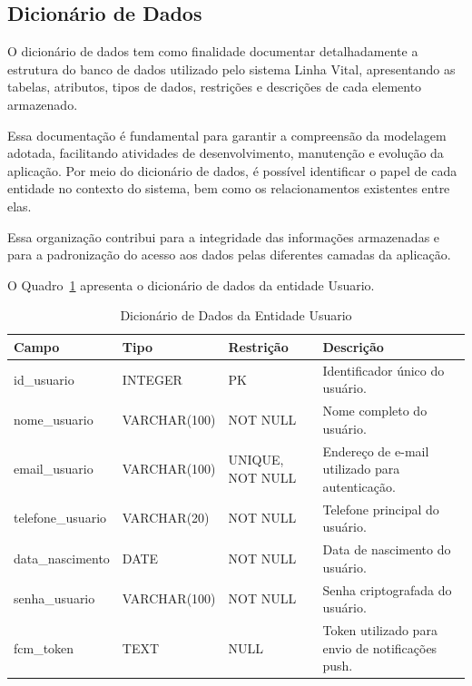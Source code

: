 \subsection{Dicionário de Dados}

O dicionário de dados tem como finalidade documentar detalhadamente a estrutura do banco de dados utilizado pelo sistema Linha Vital, apresentando as tabelas, atributos, tipos de dados, restrições e descrições de cada elemento armazenado.

Essa documentação é fundamental para garantir a compreensão da modelagem adotada, facilitando atividades de desenvolvimento, manutenção e evolução da aplicação. Por meio do dicionário de dados, é possível identificar o papel de cada entidade no contexto do sistema, bem como os relacionamentos existentes entre elas.

Essa organização contribui para a integridade das informações armazenadas e para a padronização do acesso aos dados pelas diferentes camadas da aplicação.


O Quadro~\ref{quad_usuario} apresenta o dicionário de dados da entidade Usuario.

\begin{table}[H]
\caption{Dicionário de Dados da Entidade Usuario}
\label{quad_usuario}
\centering
\footnotesize

\begin{tabular}{|p{3cm}|p{2.5cm}|p{4cm}|p{5cm}|}
\hline
\textbf{Campo} & \textbf{Tipo} & \textbf{Restrição} & \textbf{Descrição} \\
\hline

id\_usuario & INTEGER & PK & Identificador único do usuário. \\
\hline

nome\_usuario & VARCHAR(100) & NOT NULL & Nome completo do usuário. \\
\hline

email\_usuario & VARCHAR(100) & UNIQUE, NOT NULL & Endereço de e-mail utilizado para autenticação. \\
\hline

telefone\_usuario & VARCHAR(20) & NOT NULL & Telefone principal do usuário. \\
\hline

data\_nascimento & DATE & NOT NULL & Data de nascimento do usuário. \\
\hline

senha\_usuario & VARCHAR(100) & NOT NULL & Senha criptografada do usuário. \\
\hline

fcm\_token & TEXT & NULL & Token utilizado para envio de notificações push. \\
\hline

\end{tabular}

\normalsize

\end{table}

